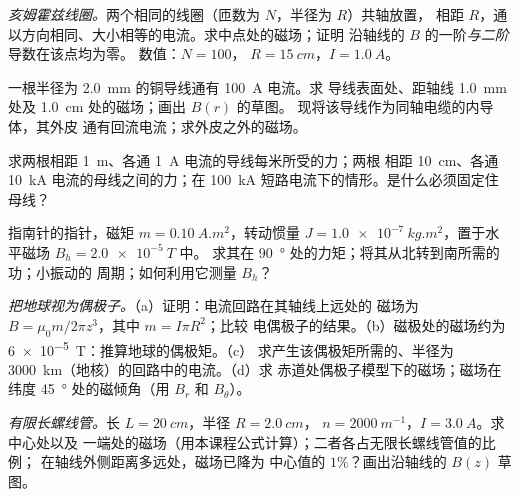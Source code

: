 \begin{exercise}[$\star\star$]\label{exo:b1:magnetostatics:6}
\emph{亥姆霍兹线圈。}两个相同的线圈（匝数为 $N$，半径为 $R$）共轴放置，
相距 $R$，通以方向相同、大小相等的电流。求中点处的磁场；证明
沿轴线的 $B$ 的一阶\emph{与二阶}导数在该点均为零。
数值：$N = 100$，
$R = \qty{15}{cm}$，$I = \qty{1.0}{A}$。
\end{exercise}

\begin{exercise}[$\star\star$]\label{exo:b1:magnetostatics:7}
一根半径为 \qty{2.0}{mm} 的铜导线通有 \qty{100}{A} 电流。求
导线表面处、距轴线 \qty{1.0}{mm} 处及 \qty{1.0}{cm} 处的磁场；画出 $B(r)$ 的草图。
现将该导线作为同轴电缆的内导体，其外皮
通有回流电流；求外皮之外的磁场。
\end{exercise}

\begin{exercise}[$\star\star$]\label{exo:b1:magnetostatics:8}
求两根相距 \qty{1}{m}、各通 \qty{1}{A} 电流的导线每米所受的力；两根
相距 \qty{10}{cm}、各通 \qty{10}{kA} 电流的母线之间的力；在
\qty{100}{kA} 短路电流下的情形。是什么必须固定住母线？
\end{exercise}

\begin{exercise}[$\star\star$]\label{exo:b1:magnetostatics:9}
指南针的指针，磁矩 $m = \qty{0.10}{A.m^2}$，转动惯量
$J = \qty{1.0e-7}{kg.m^2}$，置于水平磁场 $B_h = \qty{2.0e-5}{T}$ 中。
求其在 \qty{90}{\degree} 处的力矩；将其从北转到南所需的功；小振动的
周期；如何利用它测量 $B_h$？
\end{exercise}

\begin{exercise}[$\star\star\star$]\label{exo:b1:magnetostatics:10}
\emph{把地球视为偶极子。}（a）证明：电流回路在其轴线上远处的
磁场为 $B = \mu_0m/2\pi z^3$，其中 $m = I\pi R^2$；比较
电偶极子的结果。（b）磁极处的磁场约为
\qty{6e-5}{T}：推算地球的偶极矩。（c）
求产生该偶极矩所需的、半径为 \qty{3000}{km}（地核）的回路中的电流。（d）求
赤道处偶极子模型下的磁场；磁场在
纬度 \qty{45}{\degree} 处的磁倾角（用 $B_r$ 和 $B_\theta$）。
\end{exercise}

\begin{exercise}[$\star\star\star$]\label{exo:b1:magnetostatics:11}
\emph{有限长螺线管。}长 $L = \qty{20}{cm}$，半径 $R = \qty{2.0}{cm}$，
$n = \qty{2000}{m^{-1}}$，$I = \qty{3.0}{A}$。求中心处以及
一端处的磁场（用本课程公式计算）；二者各占无限长螺线管值的比例；
在轴线外侧距离多远处，磁场已降为
中心值的 $1\%$？画出沿轴线的 $B(z)$ 草图。
\end{exercise}

